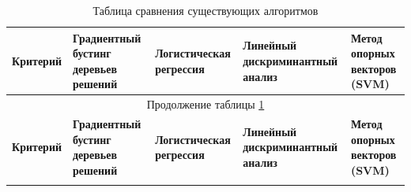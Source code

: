 {\footnotesize   %
\sloppy %

\begin{longtable}{|p{3cm}|p{3cm}|p{3cm}|p{3cm}|p{3cm}|}
  \caption{Таблица сравнения существующих алгоритмов} \label{tab:method_classification}                                                                                                                                                                                                                                                                                                          \\
  \hline
  \textbf{Критерий}                                                            & \textbf{Градиентный бустинг деревьев решений}                                       & \textbf{Логистическая регрессия}                      & \textbf{Линейный дискриминантный анализ}                                      & \textbf{Метод опорных векторов (SVM)}                                             \\ \hline
  \endfirsthead

  \multicolumn{5}{c}{\normalsize Продолжение таблицы \ref{tab:method_classification}}                                                                                                                                                                                                                                                                                                            \\ \hline
  \textbf{Критерий}                                                            & \textbf{Градиентный бустинг деревьев решений}                                       & \textbf{Логистическая регрессия}                      & \textbf{Линейный дискриминантный анализ}                                      & \textbf{Метод опорных векторов (SVM)}                                             \\ \hline
  \endhead

  \endfoot

  \hline
  \endlastfoot


\end{longtable}}
